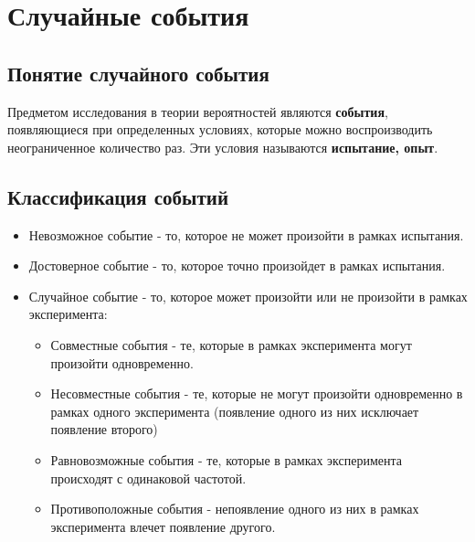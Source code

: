 \documentclass[../Main.tex]{subfiles}
\begin{document}
\chapter{Случайные события}

\section{Понятие случайного события}

Предметом исследования в теории вероятностей являются \textbf{события}, появляющиеся при определенных условиях, которые можно воспроизводить неограниченное количество раз. Эти условия называются \textbf{испытание, опыт}.



\section{Классификация событий}
\begin{itemize}
    \item Невозможное событие - то, которое не может произойти в рамках испытания.
    \item Достоверное событие - то, которое точно произойдет в рамках испытания.
    \item Случайное событие - то, которое может произойти или не произойти в рамках эксперимента:
    \begin{itemize}
        \item Совместные события - те, которые в рамках эксперимента могут произойти одновременно.
        \item Несовместные события - те, которые не могут произойти одновременно в рамках одного эксперимента (появление одного из них исключает появление второго)
        \item Равновозможные события - те, которые в рамках эксперимента происходят с одинаковой частотой.
        \item Противоположные события - непоявление одного из них в рамках эксперимента влечет появление другого.
    \end{itemize}
\end{itemize}

\end{document}

